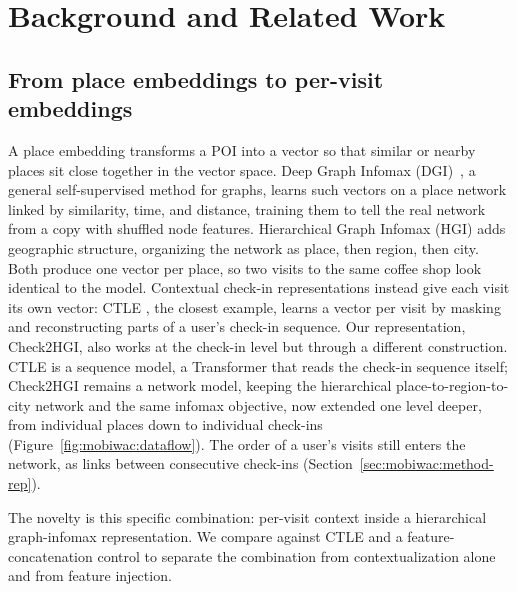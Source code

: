 \section{Background and Related Work}
\label{sec:mobiwac:related}


\subsection{From place embeddings to per-visit embeddings}
\label{sec:mobiwac:related-embeddings}
A place embedding transforms a POI into a vector so that similar or nearby
places sit close together in the vector space.
Deep Graph Infomax (DGI)~\cite{velickovic2019deep}, a general self-supervised
method for graphs, learns such vectors on a place network linked by
similarity, time, and distance, training them to tell the real network from a
copy with shuffled node features.
Hierarchical Graph Infomax (HGI) \cite{huang2023hgi} adds geographic structure,
organizing the network as place, then region, then city. Both produce one vector per place, so two visits to the same coffee shop look
identical to the model.
Contextual check-in representations instead give each visit its own vector: CTLE
\cite{lin2021ctle}, the closest example, learns a vector per visit by masking and
reconstructing parts of a user's check-in sequence. Our
representation, Check2HGI, also works at the check-in level but through a
different construction. CTLE is a sequence model, a Transformer that reads the
check-in sequence itself; Check2HGI remains a network model, keeping the
hierarchical place-to-region-to-city network and the same infomax objective,
now extended one level deeper, from individual places down to individual
check-ins (Figure~\ref{fig:mobiwac:dataflow}). The order of a user's visits still enters
the network, as links between consecutive check-ins
(Section~\ref{sec:mobiwac:method-rep}).

The novelty is this specific combination: per-visit context inside a
hierarchical graph-infomax representation. We compare against CTLE and a feature-concatenation control to separate the
combination from contextualization alone and from feature injection.

